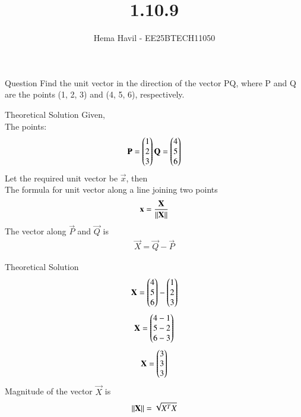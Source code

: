 \documentclass{beamer}
\title %
{1.10.9}
\author %
{Hema Havil - EE25BTECH11050}
\begin{document}
	
	\frame{\titlepage}
	\begin{frame}{Question}
		Find the unit vector in the direction of the vector PQ, where P and Q are the points (1, 2, 3) and (4, 5, 6), respectively.
	\end{frame}

	
\begin{frame}{Theoretical Solution}
	Given,\\
         The points: 
         \begin{align}
             \mathbf{P}=\begin{pmatrix}1\\2\\3\end{pmatrix} \mathbf{Q}=\begin{pmatrix}4\\5\\6\end{pmatrix}
         \end{align}
         Let the required unit vector be $\vec{x}$, then\\ 
         The formula for unit vector along a line joining two points
         \begin{align}
             \mathbf{x}=\frac{\mathbf{X}}{\left\lVert\mathbf{X}\right\rVert}
         \end{align}
         The vector along $\vec{P}$ and $\vec{Q}$ is\\
         \begin{align}
             \vec{X}=\vec{Q}-\vec{P}
         \end{align}
\end{frame}
\begin{frame}{Theoretical Solution}
\begin{align}
             \mathbf{X}=\begin{pmatrix}4\\5\\6\end{pmatrix}-\begin{pmatrix}1\\2\\3\end{pmatrix}
         \end{align}
         \begin{align}
             \mathbf{X}=\begin{pmatrix}4-1\\5-2\\6-3\end{pmatrix}
         \end{align}
         \begin{align}
             \mathbf{X}=\begin{pmatrix}3\\3\\3\end{pmatrix}
         \end{align}
         Magnitude of the vector $\vec{X}$ is\\
         \begin{align}
             \left\lVert\mathbf{X}\right\rVert=\sqrt{X^T X}
         \end{align}
	\end{frame}
\end{document}
